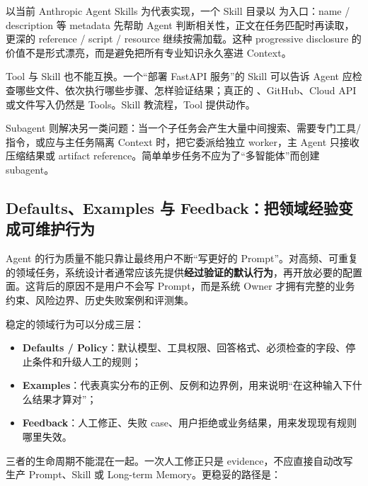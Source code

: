 \documentclass[profile=standard,twoside=false]{ipara-handbook}
\begin{document}
以当前 Anthropic Agent Skills 为代表实现，一个 Skill 目录以  为入口：name / description 等 metadata 先帮助 Agent 判断相关性，正文在任务匹配时再读取，更深的 reference / script / resource 继续按需加载。这种 progressive disclosure 的价值不是形式漂亮，而是避免把所有专业知识永久塞进 Context。

Tool 与 Skill 也不能互换。一个“部署 FastAPI 服务”的 Skill 可以告诉 Agent 应检查哪些文件、依次执行哪些步骤、怎样验证结果；真正的 、GitHub、Cloud API 或文件写入仍然是 Tools。Skill 教流程，Tool 提供动作。

Subagent 则解决另一类问题：当一个子任务会产生大量中间搜索、需要专门工具/指令，或应与主任务隔离 Context 时，把它委派给独立 worker，主 Agent 只接收压缩结果或 artifact reference。简单单步任务不应为了“多智能体”而创建 subagent。

\subsection{Defaults、Examples 与 Feedback：把领域经验变成可维护行为}

Agent 的行为质量不能只靠让最终用户不断“写更好的 Prompt”。对高频、可重复的领域任务，系统设计者通常应该先提供\textbf{经过验证的默认行为}，再开放必要的配置面。这背后的原因不是用户不会写 Prompt，而是系统 Owner 才拥有完整的业务约束、风险边界、历史失败案例和评测集。

稳定的领域行为可以分成三层：

\begin{itemize}
  \item \textbf{Defaults / Policy}：默认模型、工具权限、回答格式、必须检查的字段、停止条件和升级人工的规则；
  \item \textbf{Examples}：代表真实分布的正例、反例和边界例，用来说明“在这种输入下什么结果才算对”；
  \item \textbf{Feedback}：人工修正、失败 case、用户拒绝或业务结果，用来发现现有规则哪里失效。
\end{itemize}

三者的生命周期不能混在一起。一次人工修正只是 evidence，不应直接自动改写生产 Prompt、Skill 或 Long-term Memory。更稳妥的路径是：

\begin{processchain}
\end{processchain}
\end{document}
